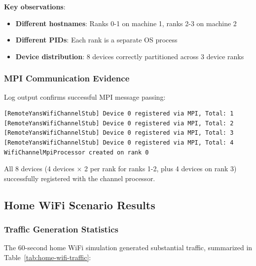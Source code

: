 \textbf{Key observations}:
\begin{itemize}
    \item \textbf{Different hostnames}: Ranks 0-1 on machine 1, ranks 2-3 on machine 2
    \item \textbf{Different PIDs}: Each rank is a separate OS process
    \item \textbf{Device distribution}: 8 devices correctly partitioned across 3 device ranks
\end{itemize}

\subsubsection{MPI Communication Evidence}

Log output confirms successful MPI message passing:

\begin{verbatim}
[RemoteYansWifiChannelStub] Device 0 registered via MPI, Total: 1
[RemoteYansWifiChannelStub] Device 0 registered via MPI, Total: 2
[RemoteYansWifiChannelStub] Device 0 registered via MPI, Total: 3
[RemoteYansWifiChannelStub] Device 0 registered via MPI, Total: 4
WifiChannelMpiProcessor created on rank 0
\end{verbatim}

All 8 devices (4 devices × 2 per rank for ranks 1-2, plus 4 devices on rank 3) successfully registered with the channel processor.

\subsection{Home WiFi Scenario Results}

\subsubsection{Traffic Generation Statistics}

The 60-second home WiFi simulation generated substantial traffic, summarized in Table~\ref{tab:home-wifi-traffic}:

